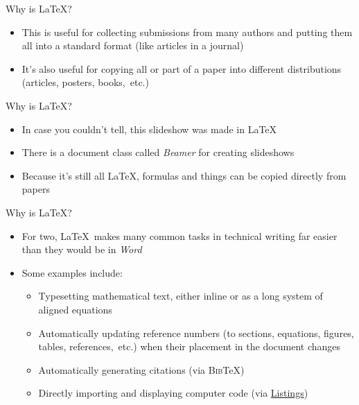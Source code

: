 \documentclass{beamer} %
\begin{document}
\begin{frame}{Why is \LaTeX?}

\begin{itemize}
	\item This is useful for collecting submissions from many authors and putting them all into a standard format (like articles in a journal)
	\item It's also useful for copying all or part of a paper into different distributions (articles, posters, books,~etc.)
\end{itemize}

\end{frame}

\begin{frame}{Why is \LaTeX?}

\begin{itemize}
	\item In case you couldn't tell, this slideshow was made in \LaTeX
	\item There is a document class called \textit{Beamer} for creating slideshows
	\item Because it's still all \LaTeX, formulas and things can be copied directly from papers
\end{itemize}

\end{frame}

\begin{frame}{Why is \LaTeX?}

\begin{itemize}
	\item For two, \LaTeX\ makes many common tasks in technical writing far easier than they would be in \textit{Word}
	\item Some examples include:
	\begin{itemize}
		\item Typesetting mathematical text, either inline or as a long system of aligned equations
		\item Automatically updating reference numbers (to sections, equations, figures, tables, references,~etc.) when their placement in the document changes
		\item Automatically generating citations (via \textsc{Bib}\TeX)
		\item Directly importing and displaying computer code (via \href{https://ctan.org/pkg/listings}{Listings})
	\end{itemize}
\end{itemize}

\end{frame}
\end{document}
